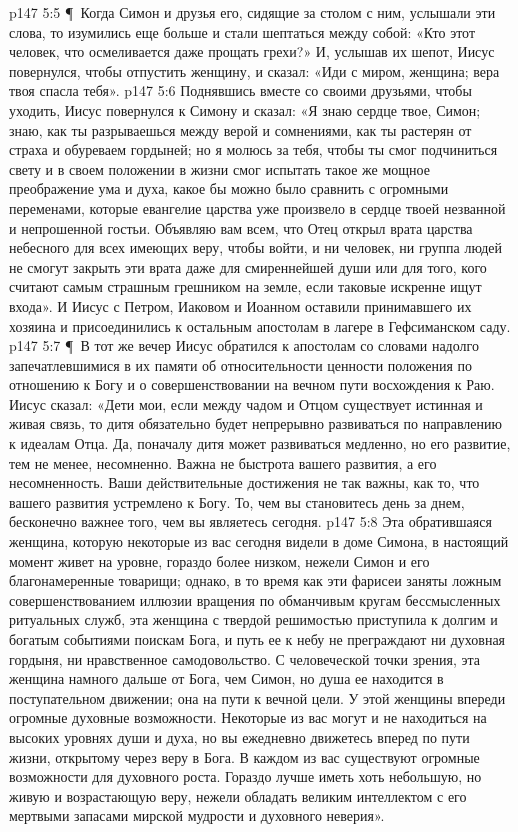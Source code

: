 \vs p147 5:5 \P\ Когда Симон и друзья его, сидящие за столом с ним, услышали эти слова, то изумились еще больше и стали шептаться между собой: «Кто этот человек, что осмеливается даже прощать грехи?» И, услышав их шепот, Иисус повернулся, чтобы отпустить женщину, и сказал: «Иди с миром, женщина; вера твоя спасла тебя».
\vs p147 5:6 Поднявшись вместе со своими друзьями, чтобы уходить, Иисус повернулся к Симону и сказал: «Я знаю сердце твое, Симон; знаю, как ты разрываешься между верой и сомнениями, как ты растерян от страха и обуреваем гордыней; но я молюсь за тебя, чтобы ты смог подчиниться свету и в своем положении в жизни смог испытать такое же мощное преображение ума и духа, какое бы можно было сравнить с огромными переменами, которые евангелие царства уже произвело в сердце твоей незванной и непрошенной гостьи. Объявляю вам всем, что Отец открыл врата царства небесного для всех имеющих веру, чтобы войти, и ни человек, ни группа людей не смогут закрыть эти врата даже для смиреннейшей души или для того, кого считают самым страшным грешником на земле, если таковые искренне ищут входа». И Иисус с Петром, Иаковом и Иоанном оставили принимавшего их хозяина и присоединились к остальным апостолам в лагере в Гефсиманском саду.
\vs p147 5:7 \P\ В тот же вечер Иисус обратился к апостолам со словами надолго запечатлевшимися в их памяти об относительности ценности положения по отношению к Богу и о совершенствовании на вечном пути восхождения к Раю. Иисус сказал: «Дети мои, если между чадом и Отцом существует истинная и живая связь, то дитя обязательно будет непрерывно развиваться по направлению к идеалам Отца. Да, поначалу дитя может развиваться медленно, но его развитие, тем не менее, несомненно. Важна не быстрота вашего развития, а его несомненность. Ваши действительные достижения не так важны, как то, что  вашего развития устремлено к Богу. То, чем вы становитесь день за днем, бесконечно важнее того, чем вы являетесь сегодня.
\vs p147 5:8 Эта обратившаяся женщина, которую некоторые из вас сегодня видели в доме Симона, в настоящий момент живет на уровне, гораздо более низком, нежели Симон и его благонамеренные товарищи; однако, в то время как эти фарисеи заняты ложным совершенствованием иллюзии вращения по обманчивым кругам бессмысленных ритуальных служб, эта женщина с твердой решимостью приступила к долгим и богатым событиями поискам Бога, и путь ее к небу не преграждают ни духовная гордыня, ни нравственное самодовольство. С человеческой точки зрения, эта женщина намного дальше от Бога, чем Симон, но душа ее находится в поступательном движении; она на пути к вечной цели. У этой женщины впереди огромные духовные возможности. Некоторые из вас могут и не находиться на высоких уровнях души и духа, но вы ежедневно движетесь вперед по пути жизни, открытому через веру в Бога. В каждом из вас существуют огромные возможности для духовного роста. Гораздо лучше иметь хоть небольшую, но живую и возрастающую веру, нежели обладать великим интеллектом с его мертвыми запасами мирской мудрости и духовного неверия».
